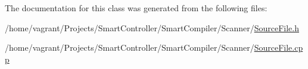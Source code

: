 The documentation for this class was generated from the following files\+:\begin{DoxyCompactItemize}
\item 
/home/vagrant/\+Projects/\+Smart\+Controller/\+Smart\+Compiler/\+Scanner/\hyperlink{_source_file_8h}{Source\+File.\+h}\item 
/home/vagrant/\+Projects/\+Smart\+Controller/\+Smart\+Compiler/\+Scanner/\hyperlink{_source_file_8cpp}{Source\+File.\+cpp}\end{DoxyCompactItemize}
